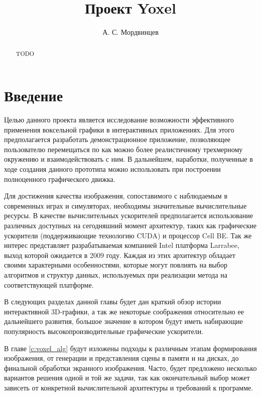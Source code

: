 \documentclass[a4paper,12pt,oneside]{article}
\title{Проект Yoxel}
\author{А. С. Мордвинцев}
\begin{document}
\sloppy  %

\maketitle

\begin{abstract}
TODO
\end{abstract}

\tableofcontents

\section{Введение}

Целью данного проекта является исследование возможности эффективного применения воксельной графики в интерактивных приложениях.
Для этого предполагается разработать демонстрационное приложение, позволяющее пользователю перемещаться по как можно более реалистичному трехмерному окружению и взаимодействовать с ним. В дальнейшем, наработки, полученные в ходе создания данного прототипа можно использовать при построении полноценного графического движка.

Для достижения качества изображения, сопоставимого с наблюдаемым в современных играх и симуляторах, необходимы значительные вычислительные ресурсы. В качестве вычислительных ускорителей предполагается использование различных доступных на сегодняшний момент архитектур, таких как графические ускорители (поддерживающие технологию CUDA) и процессор Cell BE. Так же интерес представляет разрабатываемая компанией Intel платформа Larrabee, выход которой ожидается в 2009 году. Каждая из этих архитектур обладает своими характерными особенностями, которые могут повлиять на выбор алгоритмов и структур данных, используемых при реализации метода на соответствующей платформе.

В следующих разделах данной главы будет дан краткий обзор истории интерактивной 3D-графики, а так же некоторые соображения относительно ее дальнейшего развития, большое значение в котором будут иметь набирающие популярность высокопроизводительные графические ускорители.

В главе \ref{c:voxel_alg} будут изложены подходы к различным этапам формирования изображения, от генерации и представления сцены в памяти и на дисках, до финальной обработки экранного изображения. Часто, будет предложено несколько вариантов решения одной и той же задачи, так как окончательный выбор может зависеть от конкретной вычислительной архитектуры и требований к программе.
\end{document}

